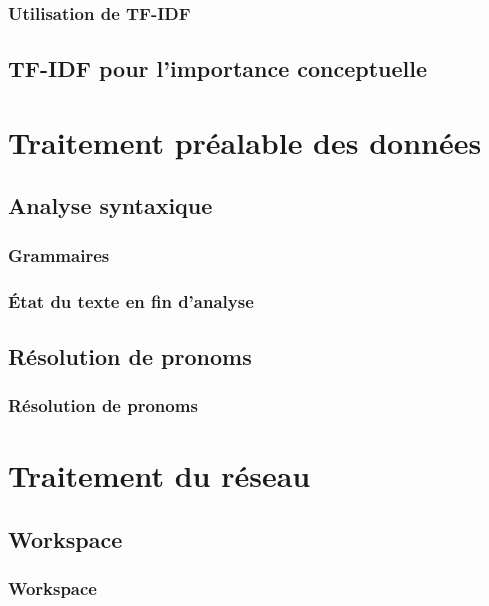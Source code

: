 \documentclass[12pt]{beamer}
\begin{document}
\begin{frame}
 \frametitle{Utilisation de TF-IDF}
 
 
\end{frame}

\subsection{TF-IDF pour l'importance conceptuelle}

\begin{frame}
 \frametitle{}
 
 
\end{frame}


\section{Traitement préalable des données}

\subsection{Analyse syntaxique}

\begin{frame}
 \frametitle{Grammaires}
 
 
\end{frame}

\begin{frame}
 \frametitle{État du texte en fin d'analyse}
 
 
\end{frame}

\subsection{Résolution de pronoms}

\begin{frame}[allowframebreaks = 0.7]
 \frametitle{Résolution de pronoms}
 
 
\end{frame}

\section{Traitement du réseau}

\subsection{Workspace}

\begin{frame}
 \frametitle{Workspace}
 
 
\end{frame}
\end{document}
